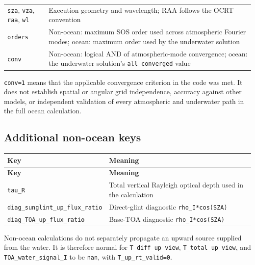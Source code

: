 {\begin{longtable}{@{}>{\raggedright\arraybackslash}p{}>{\raggedright\arraybackslash}p{}@{}}
\texttt{sza}, \texttt{vza}, \texttt{raa}, \texttt{wl} & Execution geometry and wavelength; RAA follows the OCRT convention \\
\texttt{orders} & Non-ocean: maximum SOS order used across atmospheric Fourier modes; ocean: maximum order used by the underwater solution \\
\texttt{conv} & Non-ocean: logical AND of atmospheric-mode convergence; ocean: the underwater solution's \texttt{all\_\allowbreak{}converged} value \\
\end{longtable}
}

\texttt{conv=\allowbreak{}1} means that the applicable convergence criterion in the code was met. It does not establish spatial or angular grid independence, accuracy against other models, or independent validation of every atmospheric and underwater path in the full ocean calculation.

\subsection{Additional non-ocean keys}
\label{sec:auto:05_output_formats:4.2}

{\TableFont
\begin{longtable}{@{}>{\raggedright\arraybackslash}p{}>{\raggedright\arraybackslash}p{}@{}}
\toprule
\textbf{Key} & \textbf{Meaning} \\
\midrule
\endfirsthead
\toprule
\textbf{Key} & \textbf{Meaning} \\
\midrule
\endhead
\bottomrule
\endfoot
\texttt{tau\_\allowbreak{}R} & Total vertical Rayleigh optical depth used in the calculation \\
\texttt{diag\_\allowbreak{}sunglint\_\allowbreak{}up\_\allowbreak{}flux\_\allowbreak{}ratio} & Direct-glint diagnostic \texttt{rho\_\allowbreak{}I*cos(SZA)} \\
\texttt{diag\_\allowbreak{}TOA\_\allowbreak{}up\_\allowbreak{}flux\_\allowbreak{}ratio} & Base-TOA diagnostic \texttt{rho\_\allowbreak{}I*cos(SZA)} \\
\end{longtable}
}

Non-ocean calculations do not separately propagate an upward source supplied from the water. It is therefore normal for \texttt{T\_\allowbreak{}diff\_\allowbreak{}up\_\allowbreak{}view}, \texttt{T\_\allowbreak{}total\_\allowbreak{}up\_\allowbreak{}view}, and \texttt{TOA\_\allowbreak{}water\_\allowbreak{}signal\_\allowbreak{}I} to be \texttt{nan}, with \texttt{T\_\allowbreak{}up\_\allowbreak{}rt\_\allowbreak{}valid=\allowbreak{}0}.

